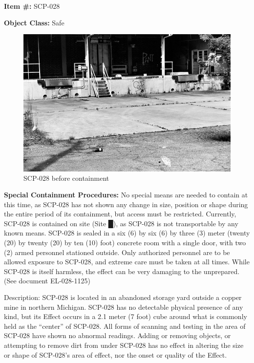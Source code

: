 
\textbf{Item \#:} SCP-028

\textbf{Object Class:} Safe

\begin{figure}[h]
\begin{center}
\includegraphics[scale=0.65]{scp/028.jpg}
\linebreak SCP-028 before containment
\end{center}
\end{figure}

\textbf{Special Containment Procedures:} No special means are needed to contain at this time, as SCP-028 has not shown any change in size, position or shape during the entire period of its containment, but access must be restricted. Currently, SCP-028 is contained on site (Site █), as SCP-028 is not transportable by any known means. SCP-028 is sealed in a six (6) by six (6) by three (3) meter (twenty (20) by twenty (20) by ten (10) foot) concrete room with a single door, with two (2) armed personnel stationed outside. Only authorized personnel are to be allowed exposure to SCP-028, and extreme care must be taken at all times. While SCP-028 is itself harmless, the effect can be very damaging to the unprepared. (See document EL-028-1125)

Description: SCP-028 is located in an abandoned storage yard outside a copper mine in northern Michigan. SCP-028 has no detectable physical presence of any kind, but its Effect occurs in a 2.1 meter (7 foot) cube around what is commonly held as the “center” of SCP-028. All forms of scanning and testing in the area of SCP-028 have shown no abnormal readings. Adding or removing objects, or attempting to remove dirt from under SCP-028 has no effect in altering the size or shape of SCP-028’s area of effect, nor the onset or quality of the Effect.

